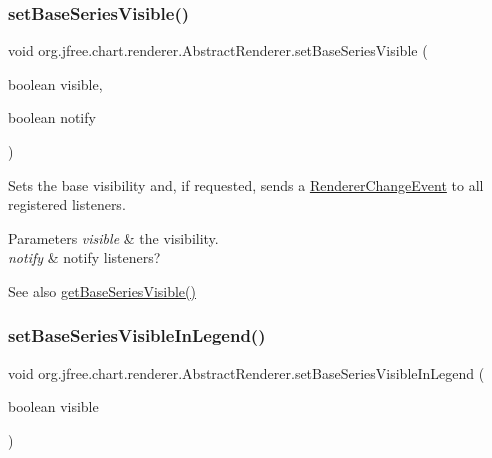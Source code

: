 \subsubsection{\texorpdfstring{set\+Base\+Series\+Visible()}{setBaseSeriesVisible()}\hspace{0.1cm}{\footnotesize\ttfamily [2/2]}}
{\footnotesize\ttfamily void org.\+jfree.\+chart.\+renderer.\+Abstract\+Renderer.\+set\+Base\+Series\+Visible (\begin{DoxyParamCaption}\item[{boolean}]{visible,  }\item[{boolean}]{notify }\end{DoxyParamCaption})}

Sets the base visibility and, if requested, sends a \mbox{\hyperlink{}{Renderer\+Change\+Event}} to all registered listeners.


\begin{DoxyParams}{Parameters}
{\em visible} & the visibility. \\
\hline
{\em notify} & notify listeners?\\
\hline
\end{DoxyParams}
\begin{DoxySeeAlso}{See also}
\mbox{\hyperlink{classorg_1_1jfree_1_1chart_1_1renderer_1_1_abstract_renderer_a854c652505643472b823747703d8b3ca}{get\+Base\+Series\+Visible()}} 
\end{DoxySeeAlso}
\mbox{\label{classorg_1_1jfree_1_1chart_1_1renderer_1_1_abstract_renderer_a9e6708a1410b3575666ecd84f2151f7c}} 
\subsubsection{\texorpdfstring{set\+Base\+Series\+Visible\+In\+Legend()}{setBaseSeriesVisibleInLegend()}\hspace{0.1cm}{\footnotesize\ttfamily [1/2]}}
{\footnotesize\ttfamily void org.\+jfree.\+chart.\+renderer.\+Abstract\+Renderer.\+set\+Base\+Series\+Visible\+In\+Legend (\begin{DoxyParamCaption}\item[{boolean}]{visible }\end{DoxyParamCaption})}

